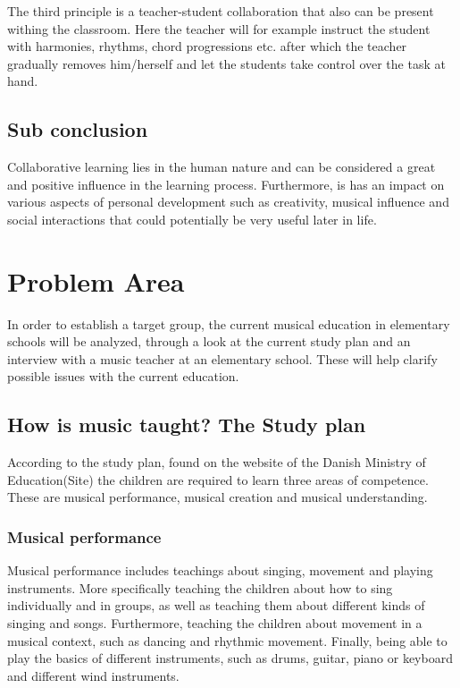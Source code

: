 The third principle is a teacher-student collaboration that also can be present withing the classroom. Here the teacher will for example instruct the student with harmonies, rhythms, chord progressions etc. after which the teacher gradually removes him/herself and let the students take control over the task at hand.\\


\subsection*{Sub conclusion}
Collaborative learning lies in the human nature and can be considered a great and positive influence in the learning process. Furthermore, is has an impact on various aspects of personal development such as creativity, musical influence and social interactions that could potentially be very useful later in life.





\section{Problem Area}\label{sec:problemArea}
In order to establish a target group, the current musical education in elementary schools will be analyzed, through a look at the current study plan and an interview with a music teacher at an elementary school. These will help clarify possible issues with the current education. \\

\subsection{How is music taught? The Study plan}\label{studyPlan}
According to the study plan, found on the website of the Danish Ministry of Education(Site) the children are required to learn three areas of competence. These are musical performance, musical creation and musical understanding.

\subsubsection*{Musical performance}
Musical performance includes teachings about singing, movement and playing instruments. More specifically teaching the children about how to sing individually and in groups, as well as teaching them about different kinds of singing and songs. Furthermore, teaching the children about movement in a musical context, such as dancing and rhythmic movement. Finally, being able to play the basics of different instruments, such as drums, guitar, piano or keyboard and different wind instruments.

